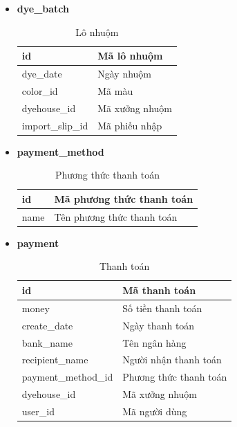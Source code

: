 \begin{itemize}
    \item \textbf{dye\_batch}
    \begin{table}[H]
        \centering
        \begin{tabular}{|m{3cm}|m{10cm}|}
        \hline 
            id & Mã lô nhuộm\\ \hline
            dye\_date & Ngày nhuộm\\ \hline
            color\_id & Mã màu \\ \hline
            dyehouse\_id & Mã xưởng nhuộm\\ \hline
            import\_slip\_id & Mã phiếu nhập\\ 
        \hline 
        \end{tabular}
        \caption{Lô nhuộm}
        \label{dye_batch}
    \end{table}
    
    \item \textbf{payment\_method}
    \begin{table}[H]
        \centering
        \begin{tabular}{|m{3cm}|m{10cm}|}
        \hline 
            id & Mã phương thức thanh toán\\ \hline
            name & Tên phương thức thanh toán\\ 
        \hline 
        \end{tabular}
        \caption{Phương thức thanh toán}
        \label{payment_method}
    \end{table}
    
    \item \textbf{payment}
    \begin{table}[H]
        \centering
        \begin{tabular}{|m{3.5cm}|m{10cm}|}
        \hline 
            id & Mã thanh toán\\ \hline
            money & Số tiền thanh toán\\ \hline
            create\_date & Ngày thanh toán \\ \hline
            bank\_name & Tên ngân hàng\\ \hline
            recipient\_name & Người nhận thanh toán\\ \hline
            payment\_method\_id & Phương thức thanh toán \\ \hline
            dyehouse\_id & Mã xưởng nhuộm\\ \hline
            user\_id & Mã người dùng\\ 
        \hline 
        \end{tabular}
        \caption{Thanh toán}
        \label{payment}
    \end{table}
    

\end{itemize}
